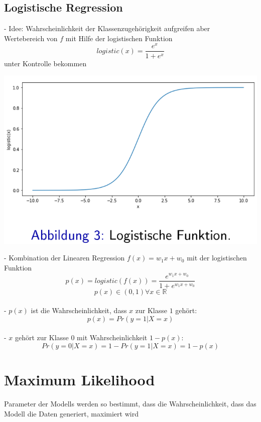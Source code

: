 \documentclass{report}
\begin{document}
\subsection{Logistische Regression}
- Idee: Wahrscheinlichkeit der Klassenzugehörigkeit aufgreifen aber\\
Wertebereich von $f$ mit Hilfe der logistischen Funktion
$$logistic(x) = \frac{e^x}{1 + e^x}$$
unter Kontrolle bekommen
\begin{center}
  \includegraphics[scale=.3]{ml03_2}
\end{center}
- Kombination der Linearen Regression $f(x) = w_1x + w_0$ mit der logistischen Funktion
$$p(x) = logistic(f(x)) = \frac{e^{w_1x + w_0}}{1 + e^{w_1x + w_0}}$$
$$p(x) \in (0, 1) \forall x \in \mathbb{R}$$\\
- $p(x)$ ist die Wahrscheinlichkeit, dass $x$ zur Klasse $1$ gehört:\\
$$p(x) = Pr(y = 1 | X = x)$$\\
- $x$ gehört zur Klasse $0$ mit Wahrscheinlichkeit $1 - p(x)$:\\
$$Pr(y = 0|X = x) = 1 - Pr(y = 1 | X = x) = 1 - p(x)$$

\section{Maximum Likelihood}
Parameter der Modells werden so bestimmt, dass die Wahrscheinlichkeit, dass das Modell die Daten generiert, maximiert wird\\
\end{document}
